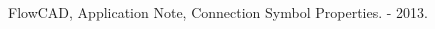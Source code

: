 \begin{thebibliography}{9}
	 FlowCAD, Application Note, Connection Symbol Properties. - 2013.
\end{thebibliography}